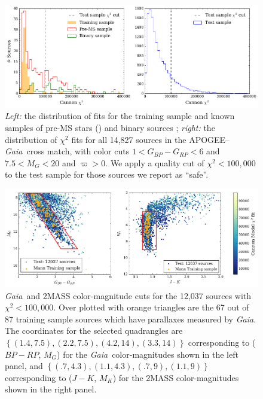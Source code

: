 \documentclass[twocolumn]{aastex62}
\newcommand{\gaia}{\textsl{Gaia}}
\begin{document}


\begin{figure}
	\includegraphics[width=\linewidth]{cannon_chi_dist.png}
	\caption{\textit{Left:} the distribution of fits for the training sample and known samples of pre-MS stars (\citealt{Cottaar:2014}) and binary sources \citep{ElBadry:2018,Skinner:2018}; \textit{right:} the distribution of $\chi^2$ fits for all 14,827 sources in the APOGEE--\gaia\ cross match, with color cuts $1<G_{BP}-G_{RP}<6$ and $7.5<M_{G}<20$ and $\varpi>0$. We apply a quality cut of $\chi^2 < 100,000$ to the test sample for those sources we report as ``safe''.}
	\label{fig:chi_dist}
\end{figure}

\begin{figure}
	\includegraphics[width=\linewidth]{cmd_selection.png}
	\caption{\gaia\ and 2MASS color-magnitude cuts for the 12,037 sources with $\chi^2<100,000$. Over plotted with orange triangles are the 67 out of 87 training sample sources which have parallaxes measured by \gaia. The coordinates for the selected quadrangles are
	$\left\{ (1.4, 7.5), (2.2, 7.5), (4.2, 14), (3.3, 14) \right\}$ corresponding to ($BP-RP$, $M_G$) for the \gaia\ color-magnitudes shown in the left panel, and 
	$\left\{ (.7, 4.3), (1.1, 4.3), (.7, 9), (1.1, 9) \right\}$ corresponding to ($J-K$, $M_K$) for the 2MASS color-magnitudes shown in the right panel. }
	\label{fig:cmd_selection}
\end{figure}
\end{document}
